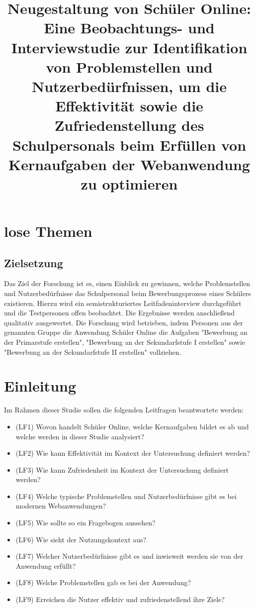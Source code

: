 \section{lose Themen}
\subsection{Zielsetzung}
Das Ziel der Forschung ist es, einen Einblick zu gewinnen, welche Problemstellen und Nutzerbedürfnisse das Schulpersonal beim Bewerbungsprozess eines Schülers existieren. Hierzu wird ein semistrukturiertes Leitfadeninterview durchgeführt und die Testpersonen offen beobachtet. Die Ergebnisse werden anschließend qualitativ ausgewertet. Die Forschung wird betrieben, indem Personen aus der genannten Gruppe die Anwendung Schüler Online die Aufgaben "Bewerbung an der Primarstufe erstellen", "Bewerbung an der Sekundarfstufe I erstellen" sowie "Bewerbung an der Sekundarfstufe II erstellen" vollziehen. 


\title{Neugestaltung von Schüler Online: Eine Beobachtungs- und Interviewstudie zur Identifikation von Problemstellen und Nutzerbedürfnissen, um die Effektivität sowie die Zufriedenstellung des Schulpersonals beim Erfüllen von Kernaufgaben der Webanwendung zu optimieren}

\section{Einleitung}
Im Rahmen dieser Studie sollen die folgenden Leitfragen beantwortete werden: 
\begin{itemize}
    \item (LF1) Wovon handelt Schüler Online, welche Kernaufgaben bildet es ab und welche werden in dieser Studie analysiert? %
    \item (LF2) Wie kann Effektivität im Kontext der Untersuchung definiert werden? %
    \item (LF3) Wie kann Zufriedenheit im Kontext der Untersuchung definiert werden? %
    \item (LF4) Welche typische Problemstellen und Nutzerbedürfnisse gibt es bei modernen Webanwendungen? %
    \item (LF5) Wie sollte so ein Fragebogen aussehen? %
    \item (LF6) Wie sieht der Nutzungskontext aus? %
    \item (LF7) Welcher Nutzerbedürfnisse gibt es und inwieweit werden sie von der Anwendung erfüllt? %
    \item (LF8) Welche Problemstellen gab es bei der Anwendung? %
    \item (LF9) Erreichen die Nutzer effektiv und zufriedenstellend ihre Ziele? %
\end{itemize}

